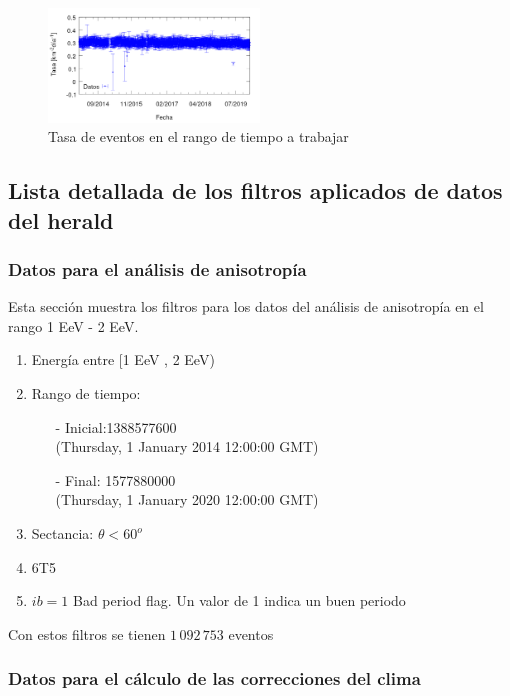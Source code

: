 \begin{figure}[H]
	\centering
	\includegraphics[width=0.5\textwidth]{rate_total.png}
	\caption{Tasa  de eventos en el rango de tiempo a trabajar}
	\label{tasa_total_diaria}
\end{figure}

\subsection{Lista detallada de los filtros aplicados de datos del herald}

\subsubsection{Datos para el análisis de anisotropía}
Esta sección muestra los filtros para los datos del análisis de anisotropía en el rango 1 EeV - 2 EeV.

\begin{enumerate}
	\item Energía entre  [1 EeV , 2 EeV)
	\item Rango de tiempo:
	\begin{itemize}
		\item[-] Inicial:1388577600 \\ (Thursday, 1 January 2014 12:00:00 GMT)
		\item[-] Final: 1577880000  \\ (Thursday, 1 January 2020 12:00:00 GMT)
	\end{itemize}
	\item Sectancia:  $\theta < 60^o$
	\item 6T5
	\item $ib=1$ Bad period flag. Un valor de 1 indica un buen periodo
\end{enumerate}

Con estos filtros se tienen $1\,092\,753$ eventos

\subsubsection{Datos para el cálculo de las correcciones del clima}

